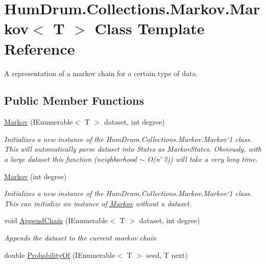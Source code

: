 \hypertarget{classHumDrum_1_1Collections_1_1Markov_1_1Markov}{}\section{Hum\+Drum.\+Collections.\+Markov.\+Markov$<$ T $>$ Class Template Reference}
\label{classHumDrum_1_1Collections_1_1Markov_1_1Markov}


A representation of a markov chain for a certain type of data.  


\subsection*{Public Member Functions}
\begin{DoxyCompactItemize}
\item 
\hyperlink{classHumDrum_1_1Collections_1_1Markov_1_1Markov_ac73669b0a13f9fd1b67986167a2de447}{Markov} (I\+Enumerable$<$ T $>$ dataset, int degree)
\begin{DoxyCompactList}\small\item\em Initializes a new instance of the Hum\+Drum.\+Collections.\+Markov.\+Markov`1 class. This will automatically parse dataset into States as Markov\+States. Obviously, with a large dataset this function (neighborhood $\sim$ O(n$^\wedge$3)) will take a very long time. \end{DoxyCompactList}\item 
\hyperlink{classHumDrum_1_1Collections_1_1Markov_1_1Markov_a696a700a50647bbe73376845bbbc3d16}{Markov} (int degree)
\begin{DoxyCompactList}\small\item\em Initializes a new instance of the Hum\+Drum.\+Collections.\+Markov.\+Markov`1 class. This can initialize an instance of \hyperlink{classHumDrum_1_1Collections_1_1Markov_1_1Markov}{Markov} without a dataset. \end{DoxyCompactList}\item 
void \hyperlink{classHumDrum_1_1Collections_1_1Markov_1_1Markov_aa73e03a727cda2f9baf47941477a94cb}{Append\+Chain} (I\+Enumerable$<$ T $>$ dataset, int degree)
\begin{DoxyCompactList}\small\item\em Appends the dataset to the current markov chain \end{DoxyCompactList}\item 
double \hyperlink{classHumDrum_1_1Collections_1_1Markov_1_1Markov_aad290aa50806e24582072bfc2dfc4da0}{Probability\+Of} (I\+Enumerable$<$ T $>$ seed, T next)

\end{DoxyCompactItemize}
